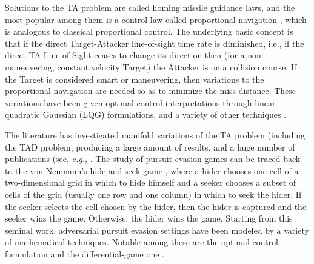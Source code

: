 Solutions to the TA problem are called homing missile guidance laws, and the most popular among them is a control law called proportional navigation \cite{adler1956missile,becker1990closed,ghose1994generalization}, which is analogous to classical proportional control. The underlying basic concept is that if the direct Target-Attacker line-of-sight time rate is diminished, i.e., if the direct TA Line-of-Sight ceases to change its direction then (for a non-maneuvering, constant velocity Target) the Attacker is on a collision course. If the Target is considered smart or maneuvering, then variations to the proportional navigation are needed so as to minimize the miss distance. These variations have been given optimal-control interpretations through linear quadratic Gaussian (LQG) formulations, and a variety of other techniques \cite{gutman2012optimal,shinar1980three,nesline2012new,anderson2012comparison,pastrick2012guidance,rodin1987pursuit,rodin1989pursuit,lin1991modern,cochran1991analytical,le1998determining,creaser1998generation,siouris2004missile,lechevin2004lyapunov,lee2007guidance,breivik2008guidance,rusnak2008guidance, shinar2009meeting,lin2010development,shneydor1998missile,pham2012fuzzy,white2012advances,li2014fuzzy,cho2014optimal,grinfeld2015minimal,zarchan1999ballistic,zarchan2000tracking,zarchan2011kill,zarchan2002tactical}.

The literature has investigated manifold variations of the TA problem (including the TAD problem, producing a large amount of results, and a huge number of publications (see, \textit{e.g.}, \cite{rodin1987pursuit,rodin1989pursuit,chung2011search,weiss2017combined,garcia2017optimal}. The study of pursuit evasion games can be traced back to the von Neumann’s hide-and-seek game \cite{flood1972hide}, where a hider chooses one cell of a two-dimensional grid in which to hide himself and a seeker chooses a subset of cells of the grid (usually one row and one column) in which to seek the hider. If the seeker selects the cell chosen by the hider, then the hider is captured and the seeker wins the game. Otherwise, the hider wins the game. Starting from this seminal work, adversarial pursuit evasion settings have been modeled by a variety of mathematical techniques. Notable among these are the optimal-control formulation and the differential-game one \cite{anderson2012comparison,turetsky2003missile,gutman20103d}. 

